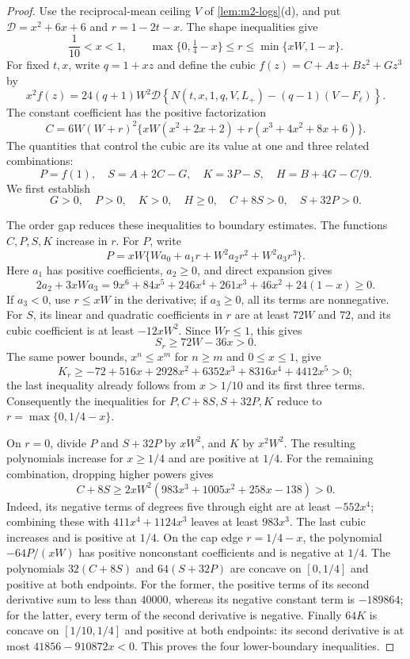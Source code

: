 \begin{proof}
Use the reciprocal-mean ceiling $V$ of \cref{lem:m2-logs}(d), and put
$\mathcal D=x^2+6x+6$ and $r=1-2t-x$. The shape inequalities give
\[
 \frac1{10}<x<1,\qquad
 \max\{0,\tfrac14-x\}\le r\le\min\{xW,1-x\}.
\]
For fixed $t,x$, write $q=1+xz$ and define the cubic $f(z)=C+Az+Bz^2+Gz^3$ by
\[
 x^2f(z)=24(q+1)W^2\mathcal D
 \left\{N(t,x,1,q,V,L_+)-(q-1)(V-F_\ell)\right\}.
\]
The constant coefficient has the positive factorization
\[
 C=6W(W+r)^2\{xW(x^2+2x+2)+r(x^3+4x^2+8x+6)\}.
\]
The quantities that control the cubic are its value at one and three related combinations:
\[
 P=f(1),\quad S=A+2C-G,\quad K=3P-S,\quad H=B+4G-C/9.
\]
We first establish
\begin{equation}\label{eq:m2-unit-boundary-bounds}
 G>0,\quad P>0,\quad K>0,\quad H\ge0,\quad C+8S>0,\quad S+32P>0.
\end{equation}

The order gap reduces these inequalities to boundary estimates.
The functions $C,P,S,K$ increase in $r$.
For $P$, write
\[
 P=xW\{Wa_0+a_1r+W^2a_2r^2+W^2a_3r^3\}.
\]
Here $a_1$ has positive coefficients, $a_2\ge0$, and direct expansion gives
\[
 2a_2+3xWa_3
 =9x^6+84x^5+246x^4+261x^3+46x^2+24(1-x)\ge0.
\]
If $a_3<0$, use $r\le xW$ in the derivative; if $a_3\ge0$, all its terms are nonnegative.
For $S$, its linear and quadratic coefficients in $r$ are at least $72W$ and $72$,
and its cubic coefficient is at least $-12xW^2$.
Since $Wr\le1$, this gives
\[
 S_r\ge72W-36x>0.
\]
The same power bounds, $x^n\le x^m$ for $n\ge m$ and $0\le x\le1$, give
\[
 K_r\ge-72+516x+2928x^2+6352x^3+8316x^4+4412x^5>0;
\]
the last inequality already follows from $x>1/10$ and its first three terms.
Consequently the inequalities for $P,C+8S,S+32P,K$ reduce to
$r=\max\{0,1/4-x\}$.

On $r=0$, divide $P$ and $S+32P$ by $xW^2$, and $K$ by $x^2W^2$.
The resulting polynomials increase for $x\ge1/4$ and are positive at $1/4$.
For the remaining combination, dropping higher powers gives
\[
 C+8S\ge2xW^2(983x^3+1005x^2+258x-138)>0.
\]
Indeed, its negative terms of degrees five through eight are at least $-552x^4$;
combining these with $411x^4+1124x^3$ leaves at least $983x^3$.
The last cubic increases and is positive at $1/4$.
On the cap edge $r=1/4-x$, the polynomial $-64P/(xW)$ has positive
nonconstant coefficients and is negative at $1/4$.
The polynomials $32(C+8S)$ and $64(S+32P)$ are concave on $[0,1/4]$
and positive at both endpoints.
For the former, the positive terms of its second derivative sum to less than $40000$,
whereas its negative constant term is $-189864$; for the latter, every term of the second
derivative is negative.
Finally $64K$ is concave on $[1/10,1/4]$ and positive at both endpoints:
its second derivative is at most $41856-910872x<0$.
This proves the four lower-boundary inequalities.


\end{proof}
